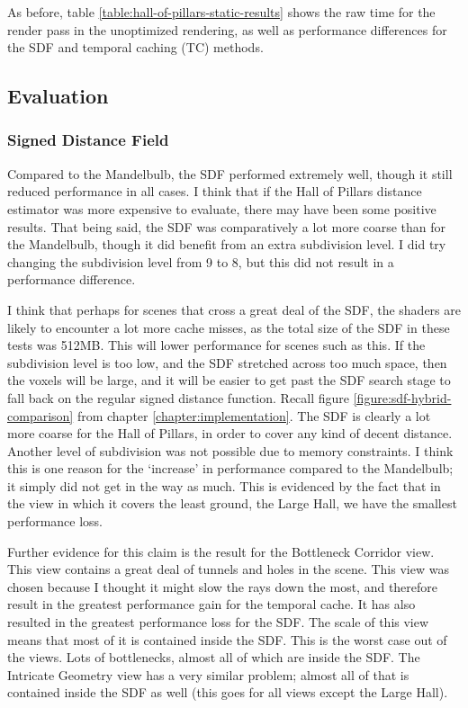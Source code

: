 As before, table \ref{table:hall-of-pillars-static-results} shows the raw time for the render pass in the unoptimized rendering, as well as performance differences for the SDF and temporal caching (TC) methods.

\subsection{Evaluation}

\subsubsection{Signed Distance Field}

Compared to the Mandelbulb, the SDF performed extremely well, though it still reduced performance in all cases. I think that if the Hall of Pillars distance estimator was more expensive to evaluate, there may have been some positive results. That being said, the SDF was comparatively a lot more coarse than for the Mandelbulb, though it did benefit from an extra subdivision level. I did try changing the subdivision level from 9 to 8, but this did not result in a performance difference.\newline

I think that perhaps for scenes that cross a great deal of the SDF, the shaders are likely to encounter a lot more cache misses, as the total size of the SDF in these tests was 512MB. This will lower performance for scenes such as this. If the subdivision level is too low, and the SDF stretched across too much space, then the voxels will be large, and it will be easier to get past the SDF search stage to fall back on the regular signed distance function. Recall figure \ref{figure:sdf-hybrid-comparison} from chapter \ref{chapter:implementation}. The SDF is clearly a lot more coarse for the Hall of Pillars, in order to cover any kind of decent distance. Another level of subdivision was not possible due to memory constraints. I think this is one reason for the `increase' in performance compared to the Mandelbulb; it simply did not get in the way as much. This is evidenced by the fact that in the view in which it covers the least ground, the Large Hall, we have the smallest performance loss.\newline

Further evidence for this claim is the result for the Bottleneck Corridor view. This view contains a great deal of tunnels and holes in the scene. This view was chosen because I thought it might slow the rays down the most, and therefore result in the greatest performance gain for the temporal cache. It has also resulted in the greatest performance loss for the SDF. The scale of this view means that most of it is contained inside the SDF. This is the worst case out of the views. Lots of bottlenecks, almost all of which are inside the SDF. The Intricate Geometry view has a very similar problem; almost all of that is contained inside the SDF as well (this goes for all views except the Large Hall).\newline

